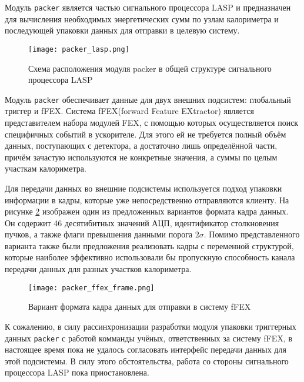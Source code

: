 Модуль \texttt{packer} является частью сигнального процессора LASP и предназначен для вычисления необходимых энергетических сумм по узлам калориметра и последующей упаковки данных для отправки в целевую систему.\par
\begin{figure}[ht]
    \centering
    \texttt{[image: packer\_lasp.png]}
    \caption{Схема расположения модуля packer в общей структуре сигнального процессора LASP}
    \label{fig:packer_lasp}
\end{figure}\par

Модуль \texttt{packer} обеспечивает данные для двух внешних подсистем: глобальный триггер и fFEX. Система fFEX(forward Feature EXtractor\parencite{tdr_blue}) является представителем набора модулей FEX, с помощью которых осуществляется поиск специфичных событий в ускорителе. Для этого ей не требуется полный объём данных, поступающих с детектора, а достаточно лишь определённой части, причём зачастую используются не конкретные значения, а суммы по целым участкам калориметра.\par
Для передачи данных во внешние подсистемы используется подход упаковки информации в кадры, которые уже непосредственно отправляются клиенту. На рисунке \ref{fig:packer_ffex_frame} изображен один из предложенных вариантов формата кадра данных. Он содержит 46 десятибитных значений АЦП, идентификатор столкновения пучков, а также флаги превышения данными порога $2 \sigma$. Помимо представленного варианта также были предложения реализовать кадры с переменной структурой, которые наиболее эффективно использовали бы пропускную способность канала передачи данных для разных участков калориметра.\par
\begin{figure}[ht]
    \centering
    \texttt{[image: packer\_ffex\_frame.png]}
    \caption{Вариант формата кадра данных для отправки в систему fFEX}
    \label{fig:packer_ffex_frame}
\end{figure}\par
К сожалению, в силу рассинхронизации разработки модуля упаковки триггерных данных \texttt{packer} с работой комманды учёных, ответственных за систему fFEX, в настоящее время пока не удалось согласовать интерфейс передачи данных для этой подсистемы. В силу этого обстоятельства, работа со стороны сигнального процессора LASP пока приостановлена.\par
